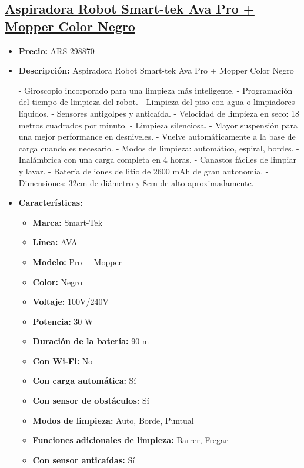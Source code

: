 \documentclass{article}
\begin{document}
\begin{adjustwidth}{2em}{}

\subsection{\uline{\href{https://www.mercadolibre.com.ar/aspiradora-robot-smart-tek-ava-pro-mopper-color-negro/p/MLA18057548}{Aspiradora Robot Smart-tek Ava Pro + Mopper Color Negro}}}
\begin{itemize}
    \item \textbf{Precio:} ARS 298870
    \item \textbf{Descripción:} Aspiradora Robot Smart-tek Ava Pro + Mopper Color Negro

- Giroscopio incorporado para una limpieza más inteligente.
- Programación del tiempo de limpieza del robot.
- Limpieza del piso con agua o limpiadores líquidos.
- Sensores antigolpes y anticaída.
- Velocidad de limpieza en seco: 18 metros cuadrados por minuto.
- Limpieza silenciosa.
- Mayor suspensión para una mejor performance en desniveles.
- Vuelve automáticamente a la base de carga cuando es necesario.
- Modos de limpieza: automático, espiral, bordes.
- Inalámbrica con una carga completa en 4 horas.
- Canastos fáciles de limpiar y lavar.
- Batería de iones de litio de 2600 mAh de gran autonomía.
- Dimensiones: 32cm de diámetro y 8cm de alto aproximadamente.
    \item \textbf{Características:} 
    \begin{itemize}
        \item \textbf {Marca:} Smart-Tek
    \item \textbf {Línea:} AVA
    \item \textbf {Modelo:} Pro + Mopper
    \item \textbf {Color:} Negro
    \item \textbf {Voltaje:} 100V/240V
    \item \textbf {Potencia:} 30 W
    \item \textbf {Duración de la batería:} 90 m
    \item \textbf {Con Wi-Fi:} No
    \item \textbf {Con carga automática:} Sí
    \item \textbf {Con sensor de obstáculos:} Sí
    \item \textbf {Modos de limpieza:} Auto, Borde, Puntual
    \item \textbf {Funciones adicionales de limpieza:} Barrer, Fregar
    \item \textbf {Con sensor anticaídas:} Sí

\end{itemize}
\end{itemize}
\end{adjustwidth}
\end{document}
